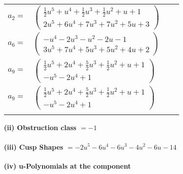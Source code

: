\documentclass[1p]{elsarticle_modified}
\theoremstyle{definition}
\begin{document}
\begin{tabular}{m{7pt} m{180pt} m{7pt} m{180pt} }
\flushright $a_{2}=$&$\begin{pmatrix}\frac{1}{2} u^5+u^4+\frac{1}{2} u^3+\frac{1}{2} u^2+u+1\\2 u^5+6 u^4+7 u^3+7 u^2+5 u+3\end{pmatrix}$ \\
\flushright $a_{6}=$&$\begin{pmatrix}- u^4-2 u^3- u^2-2 u-1\\3 u^5+7 u^4+5 u^3+5 u^2+4 u+2\end{pmatrix}$ \\
\flushright $a_{9}=$&$\begin{pmatrix}\frac{1}{2} u^5+2 u^4+\frac{5}{2} u^3+\frac{1}{2} u^2+u+1\\- u^5-2 u^4+1\end{pmatrix}$\\ \flushright $a_{9}=$&$\begin{pmatrix}\frac{1}{2} u^5+2 u^4+\frac{5}{2} u^3+\frac{1}{2} u^2+u+1\\- u^5-2 u^4+1\end{pmatrix}$\\&\end{tabular}
\flushleft \textbf{(ii) Obstruction class $= -1$}\\~\\
\flushleft \textbf{(iii) Cusp Shapes $= -2 u^5-6 u^4-6 u^3-4 u^2-6 u-14$}\\~\\
\newpage\renewcommand{\arraystretch}{1}
\flushleft \textbf{(iv) u-Polynomials at the component}\newline \\
\end{document}
